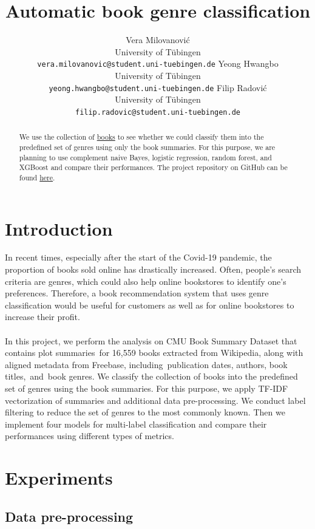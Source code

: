\documentclass{article}
\title{Automatic book genre classification}
\author{%
  Vera Milovanović\\
  University of Tübingen\\
  \texttt{vera.milovanovic@student.uni-tuebingen.de}
  \And
  Yeong Hwangbo\\
  University of Tübingen\\
  \texttt{yeong.hwangbo@student.uni-tuebingen.de}
  \And
  Filip Radović\\
  University of Tübingen\\
  \texttt{filip.radovic@student.uni-tuebingen.de}\\
}
\begin{document}
\maketitle


\begin{abstract}
  We use the collection of \href{https://www.cs.cmu.edu/~dbamman/booksummaries.html}{books} to see whether we could classify them into the predefined set of genres using only the book summaries.  For this purpose, we are planning to use complement naive Bayes, logistic regression, random forest, and XGBoost and compare their performances. The project repository on GitHub can be found \href{https://github.com/radovic/automatic-book-genre-classification}{here}.
\end{abstract}


\section{Introduction}

In recent times, especially after the start of the Covid-19 pandemic, the proportion of books sold online has drastically increased. Often, people's search criteria are genres, which could also help online bookstores to identify one’s preferences. Therefore, a book recommendation system that uses genre classification would be useful for customers as well as for online bookstores to increase their profit. \\ \\
In this project, we perform the analysis on CMU Book Summary Dataset that contains plot summaries for 16,559 books extracted from Wikipedia, along with aligned metadata from Freebase, including publication dates, authors, book titles, and book genres. We classify the collection of books into the predefined set of genres using the book summaries. For this purpose, we apply TF-IDF vectorization of summaries and additional data pre-processing. We conduct label filtering to reduce the set of genres to the most commonly known. Then we implement four models for multi-label classification and compare their performances using different types of metrics. 


\section{Experiments}

\subsection{Data pre-processing}
\end{document}
